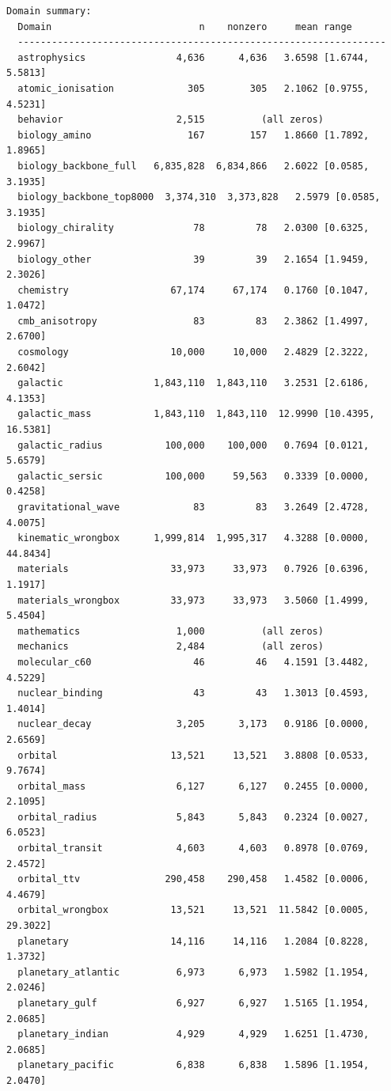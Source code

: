 \documentclass[11pt, letterpaper, openany]{book}
\begin{document}
\begin{empiricalbox}
\begin{lstlisting}[style=terminal]
Domain summary:
  Domain                          n    nonzero     mean range
  -----------------------------------------------------------------
  astrophysics                4,636      4,636   3.6598 [1.6744, 5.5813]
  atomic_ionisation             305        305   2.1062 [0.9755, 4.5231]
  behavior                    2,515          (all zeros)
  biology_amino                 167        157   1.8660 [1.7892, 1.8965]
  biology_backbone_full   6,835,828  6,834,866   2.6022 [0.0585, 3.1935]
  biology_backbone_top8000  3,374,310  3,373,828   2.5979 [0.0585, 3.1935]
  biology_chirality              78         78   2.0300 [0.6325, 2.9967]
  biology_other                  39         39   2.1654 [1.9459, 2.3026]
  chemistry                  67,174     67,174   0.1760 [0.1047, 1.0472]
  cmb_anisotropy                 83         83   2.3862 [1.4997, 2.6700]
  cosmology                  10,000     10,000   2.4829 [2.3222, 2.6042]
  galactic                1,843,110  1,843,110   3.2531 [2.6186, 4.1353]
  galactic_mass           1,843,110  1,843,110  12.9990 [10.4395, 16.5381]
  galactic_radius           100,000    100,000   0.7694 [0.0121, 5.6579]
  galactic_sersic           100,000     59,563   0.3339 [0.0000, 0.4258]
  gravitational_wave             83         83   3.2649 [2.4728, 4.0075]
  kinematic_wrongbox      1,999,814  1,995,317   4.3288 [0.0000, 44.8434]
  materials                  33,973     33,973   0.7926 [0.6396, 1.1917]
  materials_wrongbox         33,973     33,973   3.5060 [1.4999, 5.4504]
  mathematics                 1,000          (all zeros)
  mechanics                   2,484          (all zeros)
  molecular_c60                  46         46   4.1591 [3.4482, 4.5229]
  nuclear_binding                43         43   1.3013 [0.4593, 1.4014]
  nuclear_decay               3,205      3,173   0.9186 [0.0000, 2.6569]
  orbital                    13,521     13,521   3.8808 [0.0533, 9.7674]
  orbital_mass                6,127      6,127   0.2455 [0.0000, 2.1095]
  orbital_radius              5,843      5,843   0.2324 [0.0027, 6.0523]
  orbital_transit             4,603      4,603   0.8978 [0.0769, 2.4572]
  orbital_ttv               290,458    290,458   1.4582 [0.0006, 4.4679]
  orbital_wrongbox           13,521     13,521  11.5842 [0.0005, 29.3022]
  planetary                  14,116     14,116   1.2084 [0.8228, 1.3732]
  planetary_atlantic          6,973      6,973   1.5982 [1.1954, 2.0246]
  planetary_gulf              6,927      6,927   1.5165 [1.1954, 2.0685]
  planetary_indian            4,929      4,929   1.6251 [1.4730, 2.0685]
  planetary_pacific           6,838      6,838   1.5896 [1.1954, 2.0470]

\end{lstlisting}
\end{empiricalbox}
\end{document}
